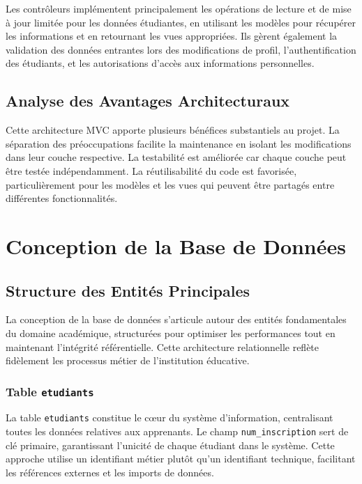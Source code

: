 \documentclass[12pt,a4paper]{report}
\begin{document}
Les contrôleurs implémentent principalement les opérations de lecture et de mise à jour limitée pour les données étudiantes, en utilisant les modèles pour récupérer les informations et en retournant les vues appropriées. Ils gèrent également la validation des données entrantes lors des modifications de profil, l'authentification des étudiants, et les autorisations d'accès aux informations personnelles.

\subsection{Analyse des Avantages Architecturaux}

Cette architecture MVC apporte plusieurs bénéfices substantiels au projet. La séparation des préoccupations facilite la maintenance en isolant les modifications dans leur couche respective. La testabilité est améliorée car chaque couche peut être testée indépendamment. La réutilisabilité du code est favorisée, particulièrement pour les modèles et les vues qui peuvent être partagés entre différentes fonctionnalités.

\section{Conception de la Base de Données}

\subsection{Structure des Entités Principales}

La conception de la base de données s'articule autour des entités fondamentales du domaine académique, structurées pour optimiser les performances tout en maintenant l'intégrité référentielle. Cette architecture relationnelle reflète fidèlement les processus métier de l'institution éducative.

\subsubsection{Table \texttt{etudiants}}

La table \texttt{etudiants} constitue le cœur du système d'information, centralisant toutes les données relatives aux apprenants. Le champ \texttt{num\_inscription} sert de clé primaire, garantissant l'unicité de chaque étudiant dans le système. Cette approche utilise un identifiant métier plutôt qu'un identifiant technique, facilitant les références externes et les imports de données.
\end{document}
